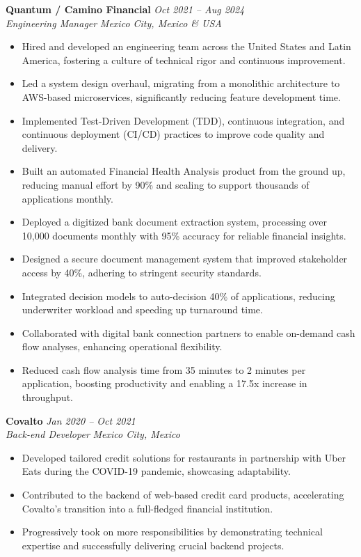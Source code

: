 \documentclass[a4paper,10pt]{article}
\begin{document}
\textbf{Quantum / Camino Financial} \hfill \textit{Oct 2021 -- Aug 2024}\\
\textit{Engineering Manager} \hfill \textit{Mexico City, Mexico \& USA}\\
\begin{itemize}[leftmargin=0.5cm, topsep=0pt, parsep=0pt, itemsep=2pt]
	\item Hired and developed an engineering team across the United States and
	      Latin America, fostering a culture of technical rigor and continuous
	      improvement.
	\item Led a system design overhaul, migrating from a monolithic architecture
	      to AWS-based microservices, significantly reducing feature development time.
	\item Implemented Test-Driven Development (TDD), continuous integration, and
	      continuous deployment (CI/CD) practices to improve code quality and delivery.
	\item Built an automated Financial Health Analysis product from the ground up,
	      reducing manual effort by 90\% and scaling to support thousands of
	      applications monthly.
	\item Deployed a digitized bank document extraction system, processing over
	      10,000 documents monthly with 95\% accuracy for reliable financial insights.
	\item Designed a secure document management system that improved stakeholder
	      access by 40\%, adhering to stringent security standards.
	\item Integrated decision models to auto-decision 40\% of applications,
	      reducing underwriter workload and speeding up turnaround time.
	\item Collaborated with digital bank connection partners to enable on-demand
	      cash flow analyses, enhancing operational flexibility.
	\item Reduced cash flow analysis time from 35 minutes to 2 minutes per
	      application, boosting productivity and enabling a 17.5x increase in
	      throughput.
\end{itemize}

\textbf{Covalto} \hfill \textit{Jan 2020 -- Oct 2021}\\
\textit{Back-end Developer} \hfill \textit{Mexico City, Mexico}\\
\begin{itemize}[leftmargin=0.5cm, topsep=0pt, parsep=0pt, itemsep=2pt]
	\item Developed tailored credit solutions for restaurants in partnership with
	      Uber Eats during the COVID-19 pandemic, showcasing adaptability.
	\item Contributed to the backend of web-based credit card products,
	      accelerating Covalto’s transition into a full-fledged financial institution.
	\item Progressively took on more responsibilities by demonstrating technical
	      expertise and successfully delivering crucial backend projects.
\end{itemize}
\end{document}
